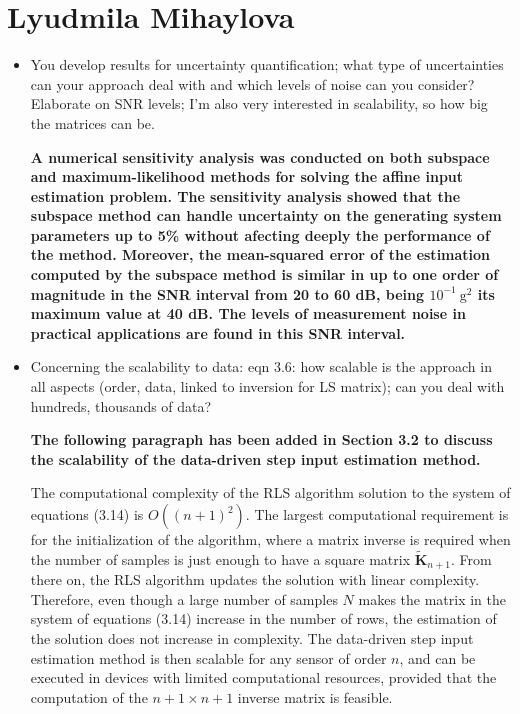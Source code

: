 \documentclass[11pt]{article}
\begin{document}
\section*{Lyudmila Mihaylova}

\begin{itemize}
	\item You develop results for uncertainty quantification; what type of uncertainties can your approach deal with and which levels of noise can you consider? Elaborate on SNR levels; I’m also very interested in scalability, so how big the matrices can be.
	
	{\bfseries A numerical sensitivity analysis was conducted on both subspace and maximum-likelihood methods for solving the affine input estimation problem. The sensitivity analysis showed that the subspace method can handle uncertainty on the generating system parameters up to 5\% without afecting deeply the performance of the method. Moreover, the mean-squared error of the estimation computed by the subspace method is similar in up to one order of magnitude in the SNR interval from 20 to 60 dB, being $10^{-1} \ \mathrm{g}^2$ its maximum value at 40 dB. The levels of measurement noise in practical applications are found in this SNR interval. }
	
	\item  Concerning the scalability to data: eqn 3.6: how scalable is the approach in all aspects (order, data, linked to inversion for LS matrix); can you deal with hundreds, thousands of data?
	
	{\bfseries The following paragraph has been added in Section 3.2 to discuss the scalability of the data-driven step input estimation method.}
	
	\color{blue}
    The computational complexity of the RLS algorithm solution to the system of equations (3.14) is $O \left( \left( n+1 \right)^2 \right)$.
    The largest computational requirement is for the initialization of the algorithm, where a matrix inverse is required when the number of samples is just enough to have a square matrix $\widetilde{\mathbf{K}}_{n+1}$.
    From there on, the RLS algorithm updates the solution with linear complexity.
    Therefore, even though a large number of samples $N$ makes the matrix in the system of equations (3.14) increase in the number of rows, the estimation of the solution does not increase in complexity. 
    The data-driven step input estimation method is then scalable for any sensor of order $n$, and can be executed in devices with limited computational resources, provided that the computation of the  $n+1 \times n+1$ inverse matrix is feasible.
    \color{black}	
	

\end{itemize}
\end{document}
